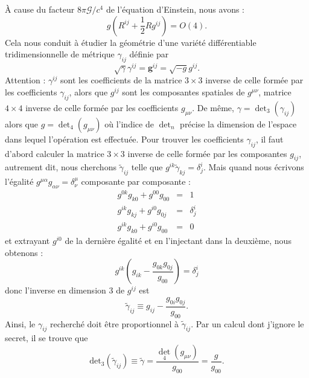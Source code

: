 			À cause du facteur $8\pi\mathscr{G}/c^4$ de l'équation d'Einstein, nous avons :
			\begin{equation}
				g\left(R^{ij}+\frac{1}{2}Rg^{ij}\right)=O(4).
			\end{equation}
			Cela nous conduit à étudier la géométrie d'une variété différentiable tridimensionnelle de métrique $\gamma_{ij}$ définie par
			\begin{equation}\label{def_gamma}
				\sqrt{\gamma}\gamma^{ij}=\textbf{g}^{ij}=\sqrt{-g}g^{ij}.
			\end{equation}
			Attention : $\gamma^{ij}$ sont les coefficients de la matrice $3\times 3$ inverse de celle formée par les coefficients $\gamma_{ij}$, alors que $g^{ij}$ sont les composantes spatiales de $g^{\mu\nu}$, matrice $4\times 4$ inverse de celle formée par les coefficients $g_{\mu\nu}$. De même, $\gamma=\det_3(\gamma_{ij})$ alors que $g=\det_4(g_{\mu\nu})$ où l'indice de $\det_n$ précise la dimension de l'espace dans lequel l'opération est effectuée.
			Pour trouver les coefficients $\gamma_{ij}$, il faut d'abord calculer la matrice $3\times 3$ inverse de celle formée par les composantes $g_{ij}$, autrement dit, nous cherchons $\tilde{\gamma}_{ij}$ telle que $g^{ik}\tilde{\gamma}_{kj}=\delta^i_j$. Mais quand nous écrivons l'égalité $g^{\mu\alpha}g_{\alpha\nu}=\delta^\mu_\nu$ composante par composante :
			\begin{eqnarray}
				g^{0k}g_{k0}+g^{00}g_{00}&=&1 \\
				g^{ik}g_{kj}+g^{i0}g_{0j}&=&\delta^i_j \\
				g^{ik}g_{k0}+g^{i0}g_{00}&=&0
			\end{eqnarray}
			et extrayant $g^{i0}$ de la dernière égalité et en l'injectant dans la deuxième, nous obtenons :
			\begin{equation}
				g^{ik}\left( g_{ik} - \frac{g_{0k}g_{0j}}{g_{00}} \right) = \delta^i_j
			\end{equation}
			donc l'inverse en dimension 3 de $g^{ij}$ est
			\begin{equation}
				\tilde{\gamma}_{ij}\equiv g_{ij}-\frac{g_{0i}g_{0j}}{g_{00}}.
			\end{equation}
			Ainsi, le $\gamma_{ij}$ recherché doit être proportionnel à $\tilde{\gamma}_{ij}$. Par un calcul dont j'ignore le secret, il se trouve que
			\begin{equation}
				\mathrm{det}_3 (\tilde{\gamma}_{ij})\equiv\tilde{\gamma} = \frac{\det_4(g_{\mu\nu})}{g_{00}}=\frac{g}{g_{00}}.
			\end{equation}
